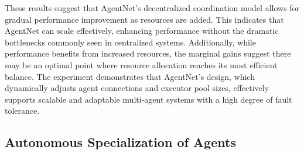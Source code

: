 \documentclass{article}
\begin{document}
These results suggest that AgentNet’s decentralized coordination model allows for gradual performance improvement as resources are added.   This indicates that AgentNet can scale effectively, enhancing performance without the dramatic bottlenecks commonly seen in centralized systems.   Additionally, while performance benefits from increased resources, the marginal gains suggest there may be an optimal point where resource allocation reaches its most efficient balance.  The experiment demonstrates that AgentNet’s design, which dynamically adjusts agent connections and executor pool sizes, effectively supports scalable and adaptable multi-agent systems with a high degree of fault tolerance.

\subsection{Autonomous Specialization of Agents}
\end{document}
